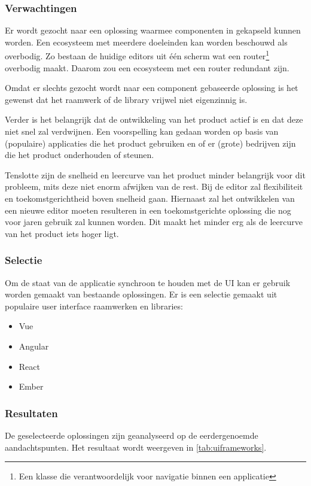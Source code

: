 \subsubsection{Verwachtingen}
Er wordt gezocht naar een oplossing waarmee componenten in gekapseld kunnen worden. Een ecosysteem met meerdere doeleinden kan worden beschouwd als overbodig. Zo bestaan de huidige editors uit één scherm wat een router\footnote{Een klasse die verantwoordelijk voor navigatie binnen een applicatie} overbodig maakt. Daarom zou een ecosysteem met een router redundant zijn.

Omdat er slechts gezocht wordt naar een component gebaseerde oplossing is het gewenst dat het raamwerk of de library vrijwel niet eigenzinnig is.

Verder is het belangrijk dat de ontwikkeling van het product actief is en dat deze niet snel zal verdwijnen. Een voorspelling kan gedaan worden op basis van (populaire) applicaties die het product gebruiken en of er (grote) bedrijven zijn die het product onderhouden of steunen.

Tenslotte zijn de snelheid en leercurve van het product minder belangrijk voor dit probleem, mits deze niet enorm afwijken van de rest. Bij de editor zal flexibiliteit en toekomstgerichtheid boven snelheid gaan. Hiernaast zal het ontwikkelen van een nieuwe editor moeten resulteren in een toekomstgerichte oplossing die nog voor jaren gebruik zal kunnen worden. Dit maakt het minder erg als de leercurve van het product iets hoger ligt.

\subsubsection{Selectie}
Om de staat van de applicatie synchroon te houden met de UI kan er gebruik worden gemaakt van bestaande oplossingen. Er is een selectie gemaakt uit populaire user interface raamwerken en libraries:
\begin{itemize}
    \item Vue
    \item Angular
    \item React
    \item Ember    
\end{itemize}

\subsubsection{Resultaten}
De geselecteerde oplossingen zijn geanalyseerd op de eerdergenoemde aandachtspunten. Het resultaat wordt weergeven in \autoref{tab:uiframeworks}.

